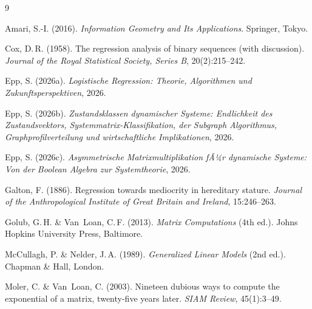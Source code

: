 ﻿\documentclass[12pt, a4paper]{article}
\theoremstyle{definition}
\theoremstyle{remark}
\begin{document}

\begin{thebibliography}{9}

Amari, S.-I. (2016).
\newblock \textit{Information Geometry and Its Applications}.
\newblock Springer, Tokyo.

Cox, D.\,R. (1958).
\newblock The regression analysis of binary sequences (with discussion).
\newblock \textit{Journal of the Royal Statistical Society, Series B}, 20(2):215--242.

Epp, S. (2026a).
\newblock \textit{Logistische Regression: Theorie, Algorithmen und
  Zukunftsperspektiven}, 2026.

Epp, S. (2026b).
\newblock \textit{Zustandsklassen dynamischer Systeme: Endlichkeit des
  Zustandsvektors, Systemmatrix-Klassifikation, der Subgraph Algorithmus,
  Graphprofilverteilung und wirtschaftliche Implikationen}, 2026.

Epp, S. (2026c).
\newblock \textit{Asymmetrische Matrixmultiplikation fÃ¼r dynamische Systeme:
  Von der Boolean Algebra zur Systemtheorie}, 2026.

Galton, F. (1886).
\newblock Regression towards mediocrity in hereditary stature.
\newblock \textit{Journal of the Anthropological Institute of Great Britain and
  Ireland}, 15:246--263.

Golub, G.\,H. \& Van~Loan, C.\,F. (2013).
\newblock \textit{Matrix Computations} (4th ed.).
\newblock Johns Hopkins University Press, Baltimore.

McCullagh, P. \& Nelder, J.\,A. (1989).
\newblock \textit{Generalized Linear Models} (2nd ed.).
\newblock Chapman \& Hall, London.

Moler, C. \& Van~Loan, C. (2003).
\newblock Nineteen dubious ways to compute the exponential of a matrix,
  twenty-five years later.
\newblock \textit{SIAM Review}, 45(1):3--49.


\end{thebibliography}
\end{document}
